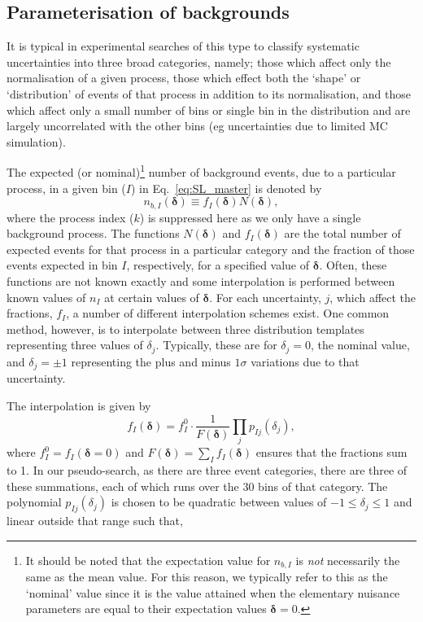 \documentclass[11pt]{article}
\begin{document}
\clearpage

\subsection{Parameterisation of backgrounds}

It is typical in experimental searches of this type to classify systematic uncertainties into three broad categories, namely; those which affect only the normalisation of a given process, those which effect both the
`shape' or `distribution' of events of that process in addition to its normalisation, and those which affect only a small number of bins or single bin in the distribution and are largely uncorrelated with the other
bins (eg uncertainties due to limited MC simulation).

The expected (or nominal)\footnote{It should be noted that the expectation value for $n_{b,I}$ is \emph{not} necessarily the same as the mean value. For this reason, we typically refer
to this as the `nominal' value since it is the value attained when the elementary nuisance parameters are equal to their expectation values $\mathbf{\delta}=0$.} number of background events, due to a particular process, in a given bin ($I$) in %
Eq.~\eqref{eq:SL_master} is denoted by
%
\begin{equation}
  n_{b,I}(\bm{\delta}) \equiv %
  f_{I}(\bm{\delta}) N(\bm{\delta}),
\end{equation}
%
where the process index ($k$) is suppressed here as we only have a single background process. The functions $N(\bm{\delta})$ and  $f_{I}(\bm{\delta})$ are the total number of expected events for that process in a particular
category and the fraction of those events expected in bin $I$, respectively, for a specified value of $\bm{\delta}$. Often, these functions are not known exactly and some interpolation is performed between known
values of $n_{I}$ at certain values of $\bm{\delta}$. For each uncertainty, $j$, which affect the fractions, $f_{I}$, a number of different interpolation schemes exist. One common method, however, is to interpolate between
three distribution templates representing three values of $\delta_{j}$. Typically, these are for $\delta_{j}=0$, the nominal value, and $\delta_{j}=\pm1$ representing the plus and minus $1\sigma$ variations due to that uncertainty.

The interpolation is given by
%
\begin{equation}
 f_{I}(\bm{\delta}) = f_{I}^{0}\cdot\frac{1}{F(\bm{\delta})} \prod_{j} p_{Ij}(\delta_{j}),
 \label{eqn:frac_function}
\end{equation}
%
where $f_{I}^{0}=f_{I}(\bm{\delta}=0)$ and $F(\bm{\delta})=\sum_{I}f_{I}(\bm{\delta})$ ensures that the fractions sum to 1. In our pseudo-search, as there are three event categories,
there are three of these summations, each of which runs over the 30 bins of that category. The polynomial $p_{Ij}(\delta_{j})$ is chosen to be quadratic between values of $-1 \leq \delta_{j} \leq 1$
and linear outside that range such that,
\end{document}
